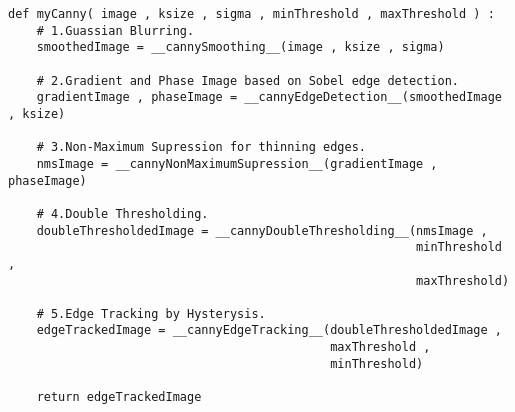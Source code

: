 
\begin{lstlisting}[caption=Python implementation for Canny Edge Detection (Main Function),label=imp:canny-main]
def myCanny( image , ksize , sigma , minThreshold , maxThreshold ) :
    # 1.Guassian Blurring.
    smoothedImage = __cannySmoothing__(image , ksize , sigma)

    # 2.Gradient and Phase Image based on Sobel edge detection.
    gradientImage , phaseImage = __cannyEdgeDetection__(smoothedImage , ksize)

    # 3.Non-Maximum Supression for thinning edges.
    nmsImage = __cannyNonMaximumSupression__(gradientImage , phaseImage)

    # 4.Double Thresholding.
    doubleThresholdedImage = __cannyDoubleThresholding__(nmsImage ,
                                                         minThreshold ,
                                                         maxThreshold)

    # 5.Edge Tracking by Hysterysis.
    edgeTrackedImage = __cannyEdgeTracking__(doubleThresholdedImage ,
                                             maxThreshold ,
                                             minThreshold)

    return edgeTrackedImage
\end{lstlisting}
